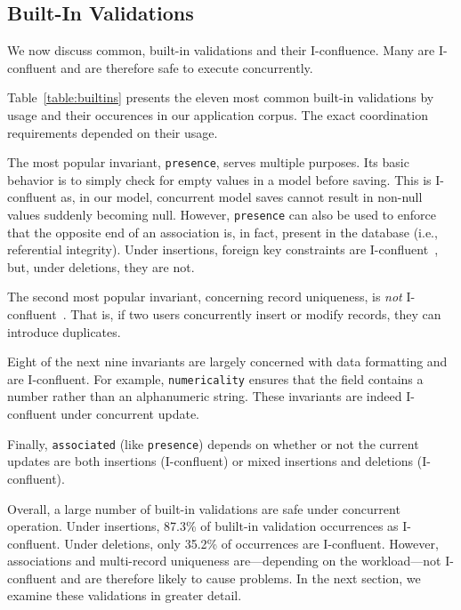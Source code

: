\subsection{Built-In Validations}

We now discuss common, built-in validations and their
I-confluence. Many are I-confluent and are therefore safe to execute
concurrently.

Table~\ref{table:builtins} presents the eleven most common built-in
validations by usage and their occurences in our application
corpus. The exact coordination requirements depended on their usage.

The most popular invariant, \texttt{presence}, serves multiple purposes. Its
basic behavior is to simply check for empty values in a model before
saving. This is I-confluent as, in our model, concurrent model saves
cannot result in non-null values suddenly becoming null. However,
\texttt{presence} can also be used to enforce that the opposite end of
an association is, in fact, present in the database (i.e., referential
integrity). Under insertions, foreign key constraints are
I-confluent~\cite{coord-avoid}, but, under deletions, they are not.

The second most popular invariant, concerning record uniqueness, is
\textit{not} I-confluent~\cite{coord-avoid}. That is, if two users
concurrently insert or modify records, they can introduce duplicates.

Eight of the next nine invariants are largely concerned with data
formatting and are I-confluent. For example, \texttt{numericality}
ensures that the field contains a number rather than an alphanumeric
string. These invariants are indeed I-confluent under concurrent
update.

Finally, \texttt{associated} (like \texttt{presence}) depends on
whether or not the current updates are both insertions (I-confluent)
or mixed insertions and deletions (I-confluent).

Overall, a large number of built-in validations are safe under
concurrent operation. Under insertions, 87.3\% of bulilt-in validation
occurrences as I-confluent. Under deletions, only 35.2\% of
occurrences are I-confluent.  However, associations and multi-record
uniqueness are---depending on the workload---not I-confluent and are
therefore likely to cause problems. In the next section, we examine
these validations in greater detail.

